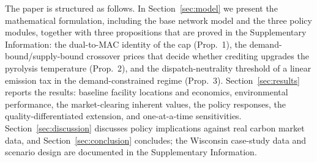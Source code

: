 The paper is structured as follows. In Section~\ref{sec:model} we present the
mathematical formulation, including the base network model and the three policy
modules, together with three propositions that are proved in the
Supplementary Information: the dual-to-MAC identity of the cap (Prop.~1), the
demand-bound/supply-bound crossover prices that decide whether crediting
upgrades the pyrolysis temperature (Prop.~2), and the dispatch-neutrality
threshold of a linear emission tax in the demand-constrained regime
(Prop.~3). Section~\ref{sec:results} reports the results: baseline facility
locations and economics, environmental performance, the market-clearing
inherent values, the policy responses, the quality-differentiated extension,
and one-at-a-time sensitivities. Section~\ref{sec:discussion} discusses policy
implications against real carbon market data, and
Section~\ref{sec:conclusion} concludes; the Wisconsin case-study data and
scenario design are documented in the Supplementary Information.
